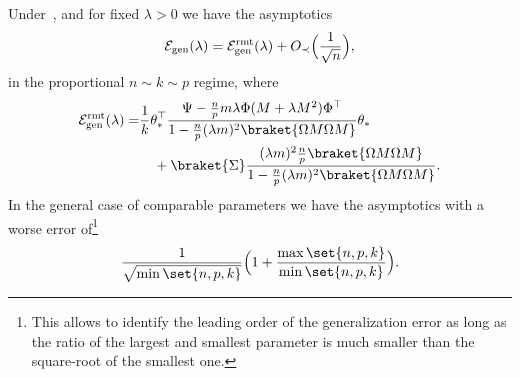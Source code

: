 \begin{theorem}\label{thm genRMT informal}
    Under~,  and  for fixed $\lambda>0$ we have the asymptotics
    \begin{equation}\label{E gen thm eq}
        \mathcal E_\mathrm{gen}(\lambda) = \mathcal E_\mathrm{gen}^\mathrm{rmt}(\lambda) + O_\prec\Bigl(\frac{1}{\sqrt{n}}\Bigr),
    \end{equation}
    in the proportional $n\sim k\sim p$ regime, where
    \begin{equation}\label{eq Egen rmt}
        \begin{aligned}
           \mathcal E_\mathrm{gen}^\mathrm{rmt}(\lambda)=&\frac{1}{k}\theta_\ast^\top \frac{ \Psi-\frac{n}{p} m\lambda \Phi (M+\lambda M^2)\Phi^\top}{1-\frac{n}{p}(\lambda m)^2\braket{\Omega M\Omega M}}\theta_\ast \\
           &\quad + \braket{\Sigma}  \frac{ (\lambda m)^2\frac{n}{p} \braket{ \Omega M\Omega M }}{1-\frac{n}{p}(\lambda m)^2\braket{\Omega M\Omega M}}.
        \end{aligned}
    \end{equation}
    In the general case of comparable parameters we have the asymptotics with a worse error of\footnote{This allows to identify the leading order of the generalization error as long as the ratio of the largest and smallest parameter is much smaller than the square-root of the smallest one.}
    \[
        \frac{1}{\sqrt{\min\set{n,p,k}}}\Bigl(1 + \frac{\max\set{n,p,k}}{\min\set{n,p,k}}\Bigr).
    \]
\end{theorem}
